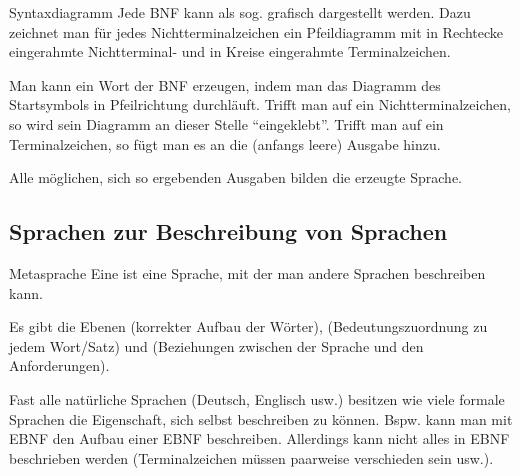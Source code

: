 \begin{Def}{Syntaxdiagramm}
    Jede BNF kann als sog.  grafisch dargestellt
    werden. Dazu zeichnet man für jedes Nichtterminalzeichen ein Pfeildiagramm
    mit in Rechtecke eingerahmte Nichtterminal- und in Kreise eingerahmte
    Terminalzeichen.
    
    Man kann ein Wort der BNF erzeugen, indem man das Diagramm des
    Startsymbols in Pfeilrichtung durchläuft. Trifft man auf ein
    Nichtterminalzeichen, so wird sein Diagramm an dieser Stelle
    "`eingeklebt"'. Trifft man auf ein Terminalzeichen, so fügt man es an die
    (anfangs leere) Ausgabe hinzu.
    
    Alle möglichen, sich so ergebenden Ausgaben bilden die erzeugte Sprache.
\end{Def}

\subsection{%
    Sprachen zur Beschreibung von Sprachen%
}

\begin{Def}{Metasprache}
    Eine  ist eine Sprache, mit der man andere Sprachen
    beschreiben kann.
    
    Es gibt die Ebenen  (korrekter Aufbau der Wörter),
     (Bedeutungszuordnung zu jedem Wort/Satz) und
     (Beziehungen zwischen der Sprache und den
    Anforderungen).
    
    Fast alle natürliche Sprachen (Deutsch, Englisch usw.) besitzen wie viele
    formale Sprachen die Eigenschaft, sich selbst beschreiben zu können.
    Bspw. kann man mit EBNF den Aufbau einer EBNF beschreiben.
    Allerdings kann nicht alles in EBNF beschrieben werden
    (Terminalzeichen müssen paarweise verschieden sein usw.).
\end{Def}

\pagebreak
